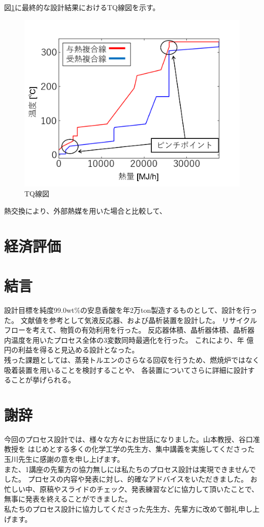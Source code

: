 \documentclass[a4j]{jsreport}
\begin{document}
図\ref{TQ線図}に最終的な設計結果におけるTQ線図を示す。
\begin{figure}[h]
    \begin{center}
        \includegraphics[scale=0.7]{TQdiagram.png}
        \caption{TQ線図}
        \label{TQ線図}
    \end{center}
\end{figure}

熱交換により、外部熱媒を用いた場合と比較して、

\newpage
\chapter{経済評価}

\newpage
\chapter{結言}
設計目標を純度99.0wt\%の安息香酸を年2万ton製造するものとして、設計を行った。
文献値を参考として気液反応器、および晶析装置を設計した。
リサイクルフローを考えて、物質の有効利用を行った。
反応器体積、晶析器体積、晶析器内温度を用いたプロセス全体の3変数同時最適化を行った。
これにより、年 億円の利益を得ると見込める設計となった。\\
残った課題としては、蒸発トルエンのさらなる回収を行うため、燃焼炉ではなく吸着装置を用いることを検討することや、
各装置についてさらに詳細に設計することが挙げられる。

\newpage
\chapter*{謝辞}
今回のプロセス設計では、様々な方々にお世話になりました。山本教授、谷口准教授を
はじめとする多くの化学工学の先生方、集中講義を実施してくださった玉川先生に感謝の意を申し上げます。\\
また、1講座の先輩方の協力無しには私たちのプロセス設計は実現できませんでした。
プロセスの内容や発表に対し、的確なアドバイスをいただきました。
お忙しい中、原稿やスライドのチェック、発表練習などに協力して頂いたことで、無事に発表を終えることができました。\\
私たちのプロセス設計に協力してくださった先生方、先輩方に改めて御礼申し上げます。
\end{document}
